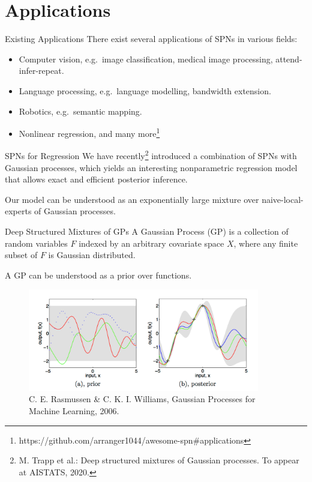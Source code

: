 \section{Applications}

\begin{frame}{Existing Applications}
There exist several applications of SPNs in various fields:
\begin{itemize}
    \item Computer vision, e.g.~image classification, medical image processing, attend-infer-repeat.
    \item Language processing, e.g.~language modelling, bandwidth extension.
    \item Robotics, e.g.~semantic mapping.
    \item Nonlinear regression, and many more\footnote{\scriptsize https://github.com/arranger1044/awesome-spn\#applications}
\end{itemize}
\end{frame}

\begin{frame}{SPNs for Regression}
We have recently\footnote{\scriptsize M. Trapp et al.: Deep structured mixtures of Gaussian processes. To appear at AISTATS, 2020.} introduced a combination of SPNs with Gaussian processes, which yields an interesting nonparametric regression model that allows exact and efficient posterior inference.

Our model can be understood as an exponentially large mixture over naive-local-experts of Gaussian processes.
\end{frame}

\begin{frame}{Deep Structured Mixtures of GPs}
    A Gaussian Process (GP) is a collection of random variables $F$ indexed by an arbitrary
    covariate space $X$, where any finite subset of $F$ is Gaussian distributed.

    A GP can be understood as a prior over functions.

    \begin{figure}
        \includegraphics[width=0.9\textwidth]{GP_Rasmussen}
        \caption{\scriptsize C. E. Rasmussen \& C. K. I. Williams, Gaussian Processes for Machine Learning, 2006.}
    \end{figure}
\end{frame}
